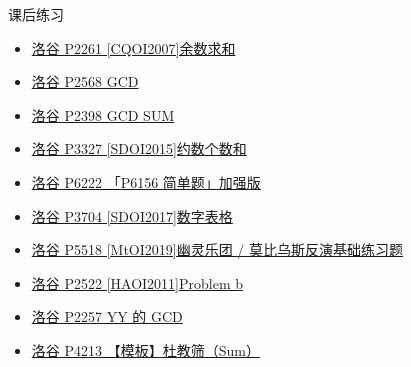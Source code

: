 \begin{frame}[fragile]{课后练习}
	\begin{itemize}
		\item \href{https://www.luogu.com.cn/problem/P2261}{洛谷 P2261 [CQOI2007]余数求和}
		\item \href{https://www.luogu.com.cn/problem/P2568}{洛谷 P2568 GCD}
		\item \href{https://www.luogu.com.cn/problem/P2398}{洛谷 P2398 GCD SUM}
		\item \href{https://www.luogu.com.cn/problem/P3327}{洛谷 P3327 [SDOI2015]约数个数和}
		\item \href{https://www.luogu.com.cn/problem/P6222}{洛谷 P6222 「P6156 简单题」加强版}
		\item \href{https://www.luogu.com.cn/problem/P3704}{洛谷 P3704 [SDOI2017]数字表格}
		\item \href{https://www.luogu.com.cn/problem/P5518}{洛谷 P5518 [MtOI2019]幽灵乐团 / 莫比乌斯反演基础练习题}
		\item \href{https://www.luogu.com.cn/problem/P2522}{洛谷 P2522 [HAOI2011]Problem b}
		\item \href{https://www.luogu.com.cn/problem/P2257}{洛谷 P2257 YY 的 GCD}
		\item \href{https://www.luogu.com.cn/problem/P4213}{洛谷 P4213 【模板】杜教筛（Sum）}
	\end{itemize}
\end{frame}

